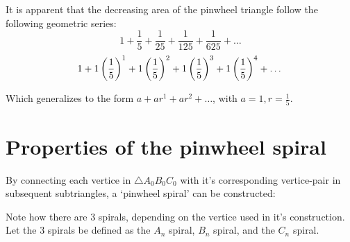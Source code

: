 \noindent
It is apparent that the decreasing area of the pinwheel triangle follow the following geometric series:
\begin{equation}
    1 + \frac{1}{5} + \frac{1}{25} + \frac{1}{125} + \frac{1}{625} + \ldots
\end{equation}
\begin{equation}
    1 + 1\left(\frac{1}{5}\right)^1 + 1\left(\frac{1}{5}\right)^2 + 1\left(\frac{1}{5}\right)^3 + 1\left(\frac{1}{5}\right)^4 + \ldots \\
\end{equation}

\noindent
Which generalizes to the form $a + ar^1 + ar^2 + \ldots$, with $a = 1, r = \frac{1}{5}$.

\section{Properties of the pinwheel spiral}
By connecting each vertice in $\triangle A_{0}B_{0}C_{0}$ with it's corresponding vertice-pair in subsequent subtriangles, a `pinwheel spiral' can be constructed:


\noindent
Note how there are 3 spirals, depending on the vertice used in it's construction. Let the 3 spirals be defined as the $A_n$ spiral, $B_n$ spiral, and the $C_n$ spiral.
